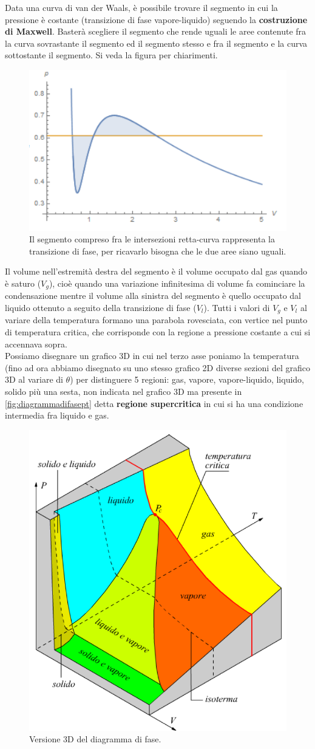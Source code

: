 \documentclass[10pt,a4paper]{article}
\begin{document}
\FloatBarrier
Data una curva di van der Waals, è possibile trovare il segmento in cui la pressione è costante (transizione di fase vapore-liquido) seguendo la \textbf{costruzione di Maxwell}. Basterà scegliere il segmento che rende uguali le aree contenute fra la curva sovrastante il segmento ed il segmento stesso e fra il segmento e la curva sottostante il segmento. Si veda la figura per chiarimenti.
\begin{figure}
	\centering
	\includegraphics[width=0.5\linewidth]{"calcolo di maxwell"}
	\caption{Il segmento compreso fra le intersezioni retta-curva rappresenta la transizione di fase, per ricavarlo bisogna che le due aree siano uguali.}
	\label{fig:calcolo-di-maxwell}
\end{figure}
\FloatBarrier
Il volume nell'estremità destra del segmento è il volume occupato dal gas quando è saturo ($V_g$), cioè quando una variazione infinitesima di volume fa cominciare la condensazione mentre il volume alla sinistra del segmento è quello occupato dal liquido ottenuto a seguito della transizione di fase ($V_l$). Tutti i valori di $V_g$ e $V_l$ al variare della temperatura formano una parabola rovesciata, con vertice nel punto di temperatura critica, che corrisponde con la regione a pressione costante a cui si accennava sopra. \\
Possiamo disegnare un grafico 3D in cui nel terzo asse poniamo la temperatura (fino ad ora abbiamo disegnato su uno stesso grafico 2D diverse sezioni del grafico 3D al variare di $\theta$) per distinguere 5 regioni: gas, vapore, vapore-liquido, liquido, solido più una sesta, non indicata nel grafico 3D ma presente in \ref{fig:diagrammadifasept} detta \textbf{regione supercritica} in cui si ha una condizione intermedia fra liquido e gas.  
\begin{figure}[h!]
	\centering
	\includegraphics[width=0.5\linewidth]{diagrammadifase3D}
	\caption{Versione 3D del diagramma di fase.}
	\label{fig:diagrammadifase3d}
\end{figure}
\end{document}

